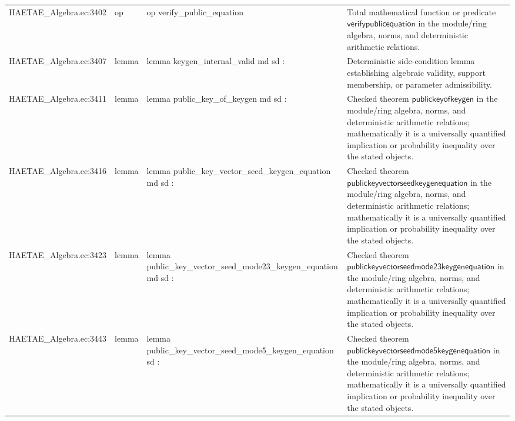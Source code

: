 \documentclass[10pt]{article}
\begin{document}
\begin{longtable}{L{0.11\textwidth}L{0.055\textwidth}L{0.385\textwidth}L{0.41\textwidth}}
HAETAE\_\allowbreak{}Algebra.\allowbreak{}ec:\allowbreak{}3402 & op & {\ttfamily\scriptsize op verify\_\allowbreak{}public\_\allowbreak{}equation} & Total mathematical function or predicate $\mathsf{verifypublicequation}$ in the module/ring algebra, norms, and deterministic arithmetic relations. \\
HAETAE\_\allowbreak{}Algebra.\allowbreak{}ec:\allowbreak{}3407 & lemma & {\ttfamily\scriptsize lemma keygen\_\allowbreak{}internal\_\allowbreak{}valid md sd :} & Deterministic side-condition lemma establishing algebraic validity, support membership, or parameter admissibility. \\
HAETAE\_\allowbreak{}Algebra.\allowbreak{}ec:\allowbreak{}3411 & lemma & {\ttfamily\scriptsize lemma public\_\allowbreak{}key\_\allowbreak{}of\_\allowbreak{}keygen md sd :} & Checked theorem $\mathsf{publickeyofkeygen}$ in the module/ring algebra, norms, and deterministic arithmetic relations; mathematically it is a universally quantified implication or probability inequality over the stated objects. \\
HAETAE\_\allowbreak{}Algebra.\allowbreak{}ec:\allowbreak{}3416 & lemma & {\ttfamily\scriptsize lemma public\_\allowbreak{}key\_\allowbreak{}vector\_\allowbreak{}seed\_\allowbreak{}keygen\_\allowbreak{}equation md sd :} & Checked theorem $\mathsf{publickeyvectorseedkeygenequation}$ in the module/ring algebra, norms, and deterministic arithmetic relations; mathematically it is a universally quantified implication or probability inequality over the stated objects. \\
HAETAE\_\allowbreak{}Algebra.\allowbreak{}ec:\allowbreak{}3423 & lemma & {\ttfamily\scriptsize lemma public\_\allowbreak{}key\_\allowbreak{}vector\_\allowbreak{}seed\_\allowbreak{}mode23\_\allowbreak{}keygen\_\allowbreak{}equation md sd :} & Checked theorem $\mathsf{publickeyvectorseedmode23keygenequation}$ in the module/ring algebra, norms, and deterministic arithmetic relations; mathematically it is a universally quantified implication or probability inequality over the stated objects. \\
HAETAE\_\allowbreak{}Algebra.\allowbreak{}ec:\allowbreak{}3443 & lemma & {\ttfamily\scriptsize lemma public\_\allowbreak{}key\_\allowbreak{}vector\_\allowbreak{}seed\_\allowbreak{}mode5\_\allowbreak{}keygen\_\allowbreak{}equation sd :} & Checked theorem $\mathsf{publickeyvectorseedmode5keygenequation}$ in the module/ring algebra, norms, and deterministic arithmetic relations; mathematically it is a universally quantified implication or probability inequality over the stated objects. \\

\end{longtable}
\end{document}
